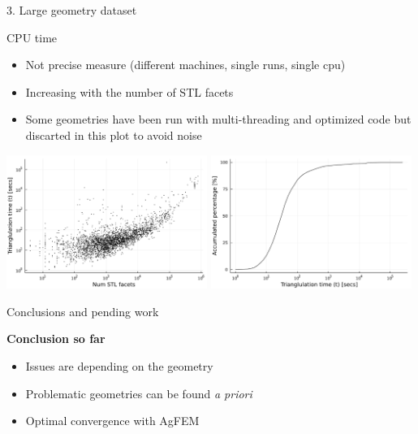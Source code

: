 \documentclass{beamer}
\begin{document}
\begin{frame}{3. Large geometry dataset}

  \begin{block}{CPU time}
  \begin{itemize}
    \item
      Not precise measure (different machines, single runs, single cpu)
    \item
      Increasing with the number of STL facets
    \item
      Some geometries have been run with multi-threading and optimized code but discarted in this plot to avoid noise
  \end{itemize}
  \end{block}

  \includegraphics[width=0.49\textwidth]{../analysis/plots/num_stl_facets_time}
  \includegraphics[width=0.49\textwidth]{../analysis/plots/histogram_time}
\end{frame}

\begin{frame}{Conclusions and pending work}

  \textbf{Conclusion so far}
  \begin{itemize}
    \item
      Issues are depending on the geometry
    \item
      Problematic geometries can be found \textit{a priori}
    \item
      Optimal convergence with AgFEM
  \end{itemize}

\end{frame}
\end{document}
